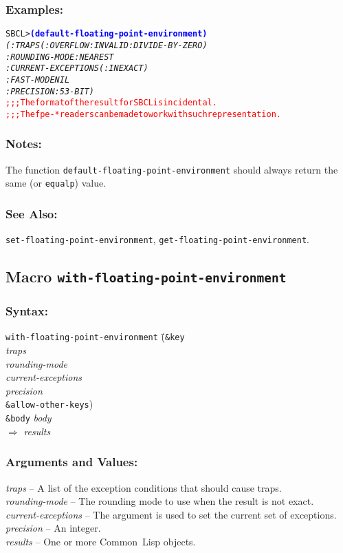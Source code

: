 \documentclass[10pt,fleqn]{article}
\newcommand{\CL}{\textsf{Common~Lisp}}
\newcommand{\code}[1]{\texttt{#1}}
\newcommand{\varname}[1]{\textit{#1}}
\newcommand{\codeprompt}[1]{\textcolor{blue}{\textbf{#1}}}
\newcommand{\DDictionaryItem}[1]{\vspace*{6pt}\noindent\hrulefill\vspace*{-9pt}\subsection*{#1}}
\newcommand{\DSyntax}{\subsubsection*{Syntax:}}
\newcommand{\DArgsNValues}{\subsubsection*{Arguments and Values:}}
\newcommand{\DExamples}{\subsubsection*{Examples:}}
\newcommand{\DNotes}{\subsubsection*{Notes:}}
\newcommand{\DSeeAlso}{\subsubsection*{See Also:}}
\begin{document}

\DExamples{}

\begin{alltt}
SBCL> \codeprompt{(default-floating-point-environment)}
\textit{(:TRAPS (:OVERFLOW :INVALID :DIVIDE-BY-ZERO)
 :ROUNDING-MODE :NEAREST
 :CURRENT-EXCEPTIONS (:INEXACT)
 :FAST-MODE NIL
 :PRECISION :53-BIT)}
\textcolor{red}{;;; The format of the result for SBCL is incidental.
;;; The fpe-* readers can be made to work with such representation.}
\end{alltt}

\DNotes{}

The function \code{default-floating-point-environment} should always return
the same (or \code{equalp}) value.

\DSeeAlso{}

\code{set-floating-point-environment}, \code{get-floating-point-environment}.


\newpage
\DDictionaryItem{Macro \code{with-floating-point-environment}}

\DSyntax{}


\begin{tabbing}
\code{with-floating-point-environment} \=(\=\code{\&key}\\
\>\>                                \varname{traps}\\
\>\>                                \varname{rounding-mode}\\
\>\>                                \varname{current-exceptions}\\
\>\>                                \varname{precision}\\
\>\>                                \code{\&allow-other-keys})\\
\> \code{\&body} \varname{body}\\
$\Rightarrow$ \varname{results}
\end{tabbing}




\DArgsNValues{}

\varname{traps} -- A list of the exception conditions that should cause
traps.\\
\varname{rounding-mode} -- The rounding mode to use when the result is
not exact.\\
\varname{current-exceptions} -- The argument is used to set the current
set of exceptions.\\
\varname{precision} -- An integer.\\
\varname{results} -- One or more \CL{} objects.
\end{document}
